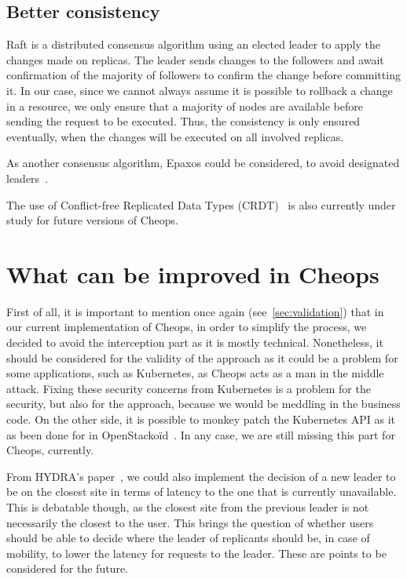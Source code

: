 \subsection{Better consistency}

Raft is a distributed consensus algorithm using an elected leader to
apply the changes made on replicas.
%
The leader sends changes to the followers and await confirmation of
the majority of followers to confirm the change before committing it.
%
In our case, since we cannot always assume it is possible to rollback
a change in a resource, we only ensure that a majority of nodes are
available before sending the request to be executed.
%
Thus, the consistency is only ensured eventually, when the changes
will be executed on all involved replicas.

As another consensus algorithm, Epaxos could be considered, to avoid
designated leaders~\cite{MAK13, TPO21}.
%

The use of Conflict-free Replicated Data Types (CRDT)~\cite{PBS18,
  SPBZ11} is also currently under study for future versions of Cheops.


\section{What can be improved in Cheops}

First of all, it is important to mention once again
(see~\autoref{sec:validation}) that in our current implementation of
Cheops, in order to simplify the process, we decided to avoid the
interception part as it is mostly technical.
%
Nonetheless, it should be considered for the validity of
the approach as it could be a problem for some applications, such as
Kubernetes, as Cheops acts as a man in the middle attack.
%
Fixing these security concerns from Kubernetes is a problem for the
security, but also for the approach, because we would be meddling in
the business code.
%
On the other side, it is possible to monkey patch the Kubernetes API
as it as been done for \os in OpenStackoïd~\cite{CLRB19}.
%
In any case, we are still missing this part for Cheops, currently.






From HYDRA's paper~\cite{JS20}, we could also implement the decision
of a new leader to be on the closest site in terms of latency to the
one that is currently unavailable.
%
This is debatable though, as the closest site from the previous
leader is not necessarily the closest to the user.
%
This brings the question of whether users should be able to decide
where the leader of replicants should be, in case of mobility, to
lower the latency for requests to the leader.
%
These are points to be considered for the future.

